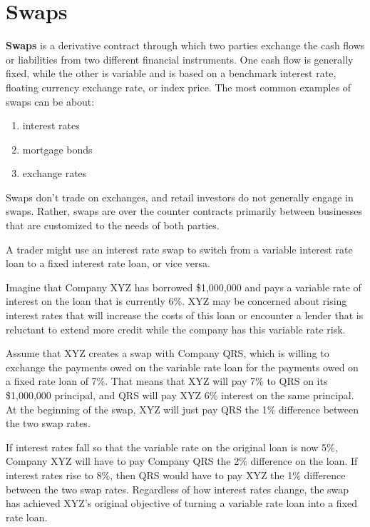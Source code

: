 \documentclass{article}
\begin{document}
\section{Swaps}

  \begin{definition}[Swap]
    \textbf{Swaps} is a derivative contract through which two parties exchange the cash flows or liabilities from two different financial instruments. One cash flow is generally fixed, while the other is variable and is based on a benchmark interest rate, floating currency exchange rate, or index price. The most common examples of swaps can be about: 
    \begin{enumerate}
      \item interest rates
      \item mortgage bonds 
      \item exchange rates
    \end{enumerate}
    Swaps don't trade on exchanges, and retail investors do not generally engage in swaps. Rather, swaps are over the counter contracts primarily between businesses that are customized to the needs of both parties. 
  \end{definition}

  \begin{example}
    A trader might use an interest rate swap to switch from a variable interest rate loan to a fixed interest rate loan, or vice versa. 

    Imagine that Company XYZ has borrowed \$1,000,000 and pays a variable rate of interest on the loan that is currently 6\%. XYZ may be concerned about rising interest rates that will increase the costs of this loan or encounter a lender that is reluctant to extend more credit while the company has this variable rate risk. 

    Assume that XYZ creates a swap with Company QRS, which is willing to exchange the payments owed on the variable rate loan for the payments owed on a fixed rate loan of 7\%. That means that XYZ will pay 7\% to QRS on its \$1,000,000 principal, and QRS will pay XYZ 6\% interest on the same principal. At the beginning of the swap, XYZ will just pay QRS the 1\% difference between the two swap rates.

    If interest rates fall so that the variable rate on the original loan is now 5\%, Company XYZ will have to pay Company QRS the 2\% difference on the loan. If interest rates rise to 8\%, then QRS would have to pay XYZ the 1\% difference between the two swap rates. Regardless of how interest rates change, the swap has achieved XYZ's original objective of turning a variable rate loan into a fixed rate loan.
  \end{example}
\end{document}
